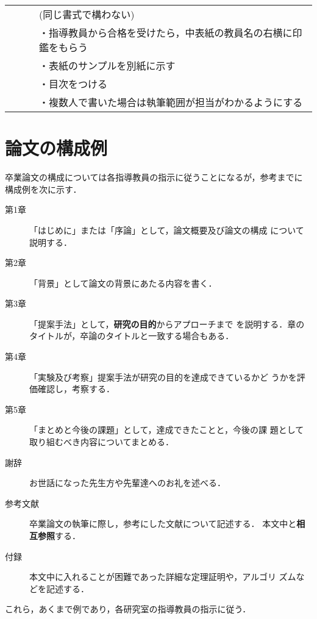 \begin{tabular}{llcl}
      &                           &   & \hspace*{1zw}(同じ書式で構わない)                        \\
      &                           &   & ・指導教員から合格を受けたら，中表紙の教員名の右横に印
  鑑をもらう                                                                                     \\
      &                           &   & ・表紙のサンプルを別紙に示す                             \\
      &                           &   & ・目次をつける                                           \\
      &                           &   & ・複数人で書いた場合は執筆範囲が担当がわかるようにする   \\
\end{tabular}

\section{論文の構成例}

卒業論文の構成については各指導教員の指示に従うことになるが，参考までに
構成例を次に示す．

\begin{description}
  \item[第1章] 「はじめに」または「序論」として，論文概要及び論文の構成
        について説明する．
  \item[第2章] 「背景」として論文の背景にあたる内容を書く．
  \item[第3章] 「提案手法」として，\textbf{研究の目的}からアプローチまで
        を説明する．章のタイトルが，卒論のタイトルと一致する場合もある．
  \item[第4章] 「実験及び考察」提案手法が研究の目的を達成できているかど
        うかを評価確認し，考察する．
  \item[第5章] 「まとめと今後の課題」として，達成できたことと，今後の課
        題として取り組むべき内容についてまとめる．
  \item[謝辞] お世話になった先生方や先輩達へのお礼を述べる．
  \item[参考文献] 卒業論文の執筆に際し，参考にした文献について記述する．
        本文中と\textbf{相互参照}する．
  \item[付録] 本文中に入れることが困難であった詳細な定理証明や，アルゴリ
        ズムなどを記述する．
\end{description}
これら，あくまで例であり，各研究室の指導教員の指示に従う．

